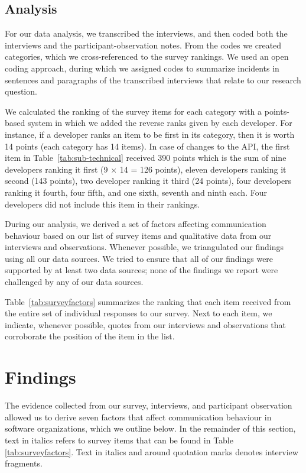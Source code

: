 \documentclass{sig-alternate}
\begin{document}
\subsection{Analysis} 

For our data analysis, we transcribed the interviews, and then coded both the interviews and the participant-observation notes. From the codes we created categories, which we cross-referenced to the survey rankings. We used an open coding approach, during which we assigned codes to summarize incidents in sentences and paragraphs of the transcribed interviews that relate to our research question.

We calculated the ranking of the survey items for each category with a points-based system in which we added the reverse ranks given by each developer.
For instance, if a developer ranks an item to be first in its category, then it is worth 14 points (each category has 14 items).
In case of changes to the API, the first item in Table~\ref{tab:sub-technical} received 390 points which is the sum of nine developers ranking it first (9 $\times$ 14 = 126 points), eleven developers ranking it second (143 points), two developer ranking it third (24 points), four developers ranking it fourth, four fifth, and one sixth, seventh and ninth each. Four developers did not include this item in their rankings.

During our analysis, we derived a set of factors affecting communication behaviour based on our list of survey items and qualitative data from our interviews and observations. Whenever possible, we triangulated our findings using all our data sources. We tried to ensure that all of our findings were supported by at least two data sources; none of the findings we report were challenged by any of our data sources. 

Table~\ref{tab:surveyfactors} summarizes the ranking that each item received from the entire set of individual responses to our survey. Next to each item, we indicate, whenever possible, quotes from our interviews and observations that corroborate the position of the item in the list.


\section{Findings}
\label{sec:findings}

The evidence collected from our survey, interviews, and participant observation allowed us to derive seven factors that affect communication behaviour in software organizations, which we outline below. In the remainder of this section, text in italics refers to survey items that can be found in Table \ref{tab:surveyfactors}. Text in italics and around quotation marks denotes interview fragments.
\end{document}
